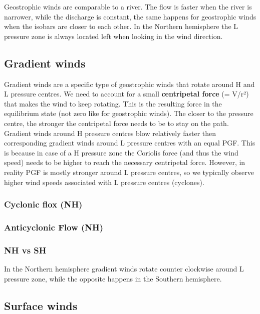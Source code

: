 \documentclass[oneside]{book}
\begin{document}
Geostrophic winds are comparable to a river. The flow is faster when the
river is narrower, while the discharge is constant, the same happens for
geostrophic winds when the isobars are closer to each other. In the
Northern hemisphere the L pressure zone is always located left when
looking in the wind direction.

\subsection{Gradient winds}\label{gradient-winds}

Gradient winds are a specific type of geostrophic winds that rotate
around H and L pressure centres. We need to account for a small
\textbf{centripetal force} (= V/r²) that makes the wind to keep
rotating. This is the resulting force in the equilibrium state (not zero
like for geostrophic winds). The closer to the pressure centre, the
stronger the centripetal force needs to be to stay on the path. Gradient
winds around H pressure centres blow relatively faster then
corresponding gradient winds around L pressure centres with an equal
PGF. This is because in case of a H pressure zone the Coriolis force
(and thus the wind speed) needs to be higher to reach the necessary
centripetal force. However, in reality PGF is mostly stronger around L
pressure centres, so we typically observe higher wind speeds associated
with L pressure centres (cyclones).

\subsubsection{Cyclonic flox (NH)}\label{cyclonic-flox-nh}

\subsubsection{Anticyclonic Flow (NH)}\label{anticyclonic-flow-nh}

\subsubsection{NH vs SH}\label{nh-vs-sh}

In the Northern hemisphere gradient winds rotate counter clockwise
around L pressure zone, while the opposite happens in the Southern
hemisphere.

\subsection{Surface winds}\label{surface-winds}
\end{document}

